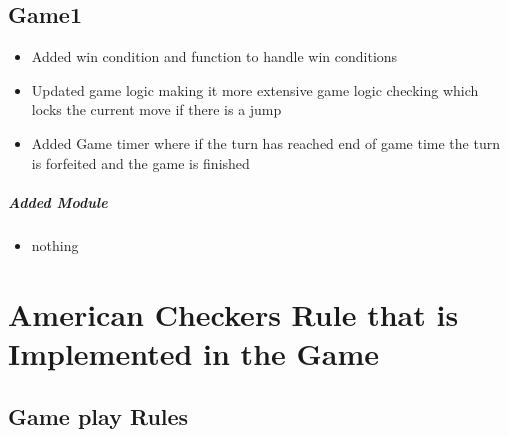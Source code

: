 \documentclass[10pt]{article}
\begin{document}
	\subsection{Game1}	
	\begin{itemize}
	\item Added win condition and function to handle win conditions
	\item Updated game logic making it more extensive game logic checking which locks the current move if there is a jump
	\item Added Game timer where if the turn has reached end of game time the turn is forfeited and the game is finished
	\end{itemize}	
	
	\subparagraph{Added Module}
	\begin{itemize}
	\item nothing
	\end{itemize}
\newpage
\section{American Checkers Rule that is Implemented in the Game} 
	\subsection{Game play Rules}
\end{document}

